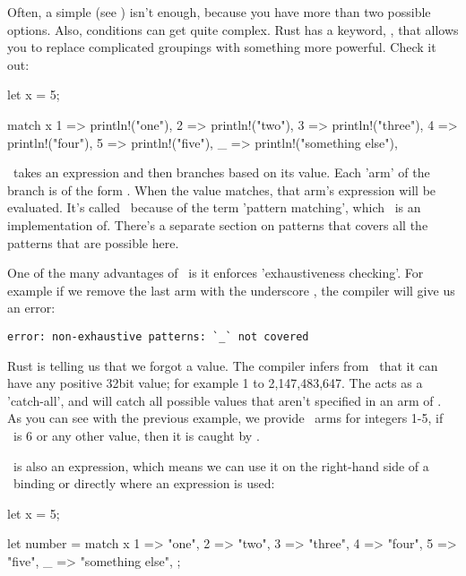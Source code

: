 Often, a simple  (see ) isn't enough, because you have more than two possible options. Also, 
conditions can get quite complex. Rust has a keyword, \match, that allows you to replace complicated  groupings with 
something more powerful. Check it out:

\begin{rustc}
let x = 5;

match x {
    1 => println!("one"),
    2 => println!("two"),
    3 => println!("three"),
    4 => println!("four"),
    5 => println!("five"),
    _ => println!("something else"),
}
\end{rustc}

\match\ takes an expression and then branches based on its value. Each 'arm' of the branch is of the form . When 
the value matches, that arm's expression will be evaluated. It's called \match\ because of the term 'pattern matching', which \match\ is 
an implementation of. There's a separate section on patterns that covers all the patterns that are possible here.

\blank

One of the many advantages of \match\ is it enforces 'exhaustiveness checking'. For example if we remove the last arm with the 
underscore \code{\_}, the compiler will give us an error:

\begin{verbatim}
error: non-exhaustive patterns: `_` not covered
\end{verbatim}

Rust is telling us that we forgot a value. The compiler infers from \x\ that it can have any positive 32bit value; for example 1 
to 2,147,483,647. The \code{\_} acts as a 'catch-all', and will catch all possible values that aren't specified in an arm of \match. 
As you can see with the previous example, we provide \match\ arms for integers 1-5, if \x\ is 6 or any other value, then it is caught 
by \code{\_}.

\blank

\match\ is also an expression, which means we can use it on the right-hand side of a \keylet\ binding or directly where an expression 
is used:

\begin{rustc}
let x = 5;

let number = match x {
    1 => "one",
    2 => "two",
    3 => "three",
    4 => "four",
    5 => "five",
    _ => "something else",
};
\end{rustc}


